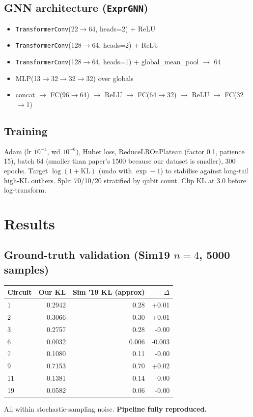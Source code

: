 \documentclass[11pt]{article}
\begin{document}
\subsection{GNN architecture (\texttt{ExprGNN})}
\begin{itemize}
  \item \texttt{TransformerConv}(22\(\to\)64, heads=2) + ReLU
  \item \texttt{TransformerConv}(128\(\to\)64, heads=2) + ReLU
  \item \texttt{TransformerConv}(128\(\to\)64, heads=1) + global\_mean\_pool \(\to\) 64
  \item MLP(13\(\to\)32\(\to\)32\(\to\)32) over globals
  \item concat \(\to\) FC(96\(\to\)64) \(\to\) ReLU \(\to\) FC(64\(\to\)32) \(\to\) ReLU \(\to\) FC(32\(\to\)1)
\end{itemize}

\subsection{Training}
Adam (lr \(10^{-4}\), wd \(10^{-6}\)), Huber loss,
ReduceLROnPlateau (factor 0.1, patience 15), batch 64 (smaller than
paper's 1500 because our dataset is smaller), 300 epochs. Target
\(\log(1+\mathrm{KL})\) (undo with \(\exp - 1\)) to stabilise against
long-tail high-KL outliers. Split 70/10/20 stratified by qubit count.
Clip KL at 3.0 before log-transform.

\section{Results}

\subsection{Ground-truth validation (Sim19 \(n\!=\!4\), 5000 samples)}
\begin{center}
\begin{tabular}{lrrr}
\toprule
Circuit & Our KL & Sim '19 KL (approx) & \(\Delta\) \\
\midrule
1  & 0.2942 & 0.28  & +0.01 \\
2  & 0.3066 & 0.30  & +0.01 \\
3  & 0.2757 & 0.28  & -0.00 \\
6  & 0.0032 & 0.006 & -0.003 \\
7  & 0.1080 & 0.11  & -0.00 \\
9  & 0.7153 & 0.70  & +0.02 \\
11 & 0.1381 & 0.14  & -0.00 \\
19 & 0.0582 & 0.06  & -0.00 \\
\bottomrule
\end{tabular}
\end{center}
All within stochastic-sampling noise. \textbf{Pipeline fully reproduced.}
\end{document}

